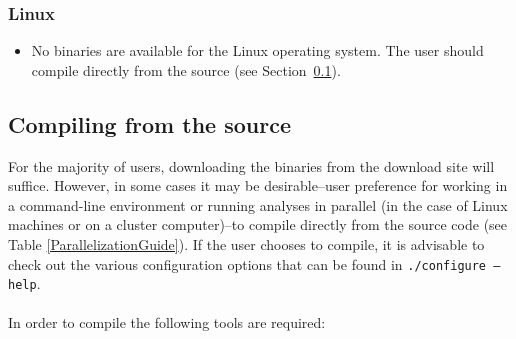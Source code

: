 \begin{flushleft}
\begin{minipage}[t]{0.88\textwidth}
	   	\subsubsection*{Linux}
	\end{minipage}
		\begin{itemize}
			\item  No binaries are available for the Linux operating system.  The user should compile
			\poy directly from the source (see Section~\ref{Compilingfromsource}). 
		\end{itemize} 

\end{flushleft}

\subsection{Compiling from the source}
\label{Compilingfromsource}

For the majority of users, downloading the binaries from the \poy download site will suffice.  However, in 
some cases it may be %
 desirable--user preference for working in a command-line environment or running \poy analyses in parallel 
 (in the case of Linux machines or on a cluster computer)--to compile \poy directly from the source code (see 
 Table %
  \ref{ParallelizationGuide}). If the user chooses to compile, it is advisable to check out the various configuration 
  options that can be found in {\tt ./configure --help}. \\
\\
In order to compile \poy the following tools are required:

